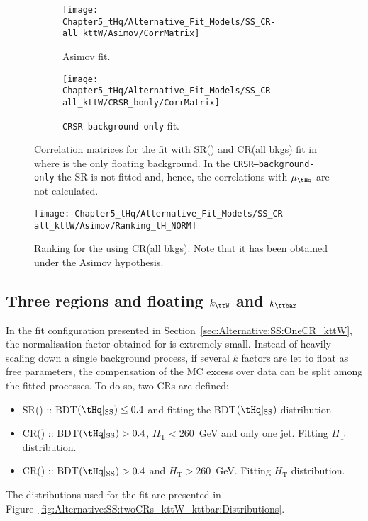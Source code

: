 \begin{figure}[h]
\centering
\begin{subfigure}{.5\textwidth}
  \centering
  \texttt{[image: Chapter5\_tHq/Alternative\_Fit\_Models/SS\_CR-all\_kttW/Asimov/CorrMatrix]}
  \caption{Asimov fit.}
\end{subfigure}%
\begin{subfigure}{.5\textwidth}
  \centering
  \texttt{[image: Chapter5\_tHq/Alternative\_Fit\_Models/SS\_CR-all\_kttW/CRSR\_bonly/CorrMatrix]}
  \caption{\texttt{CRSR--background-only} fit.}
\end{subfigure}
\caption{Correlation matrices for the fit with SR(\tHq) and CR(all bkgs) fit in \dilepSStau where \ttW is the only floating background.
	In the \texttt{CRSR--background-only} the SR is not fitted and, hence, the correlations with $\mu_{\tHq}$ are not calculated. }
\label{fig:Alternative:SS:OneCR_kttW:matrices}
\end{figure}


\begin{figure}[h]
\centering
  \centering
  \texttt{[image: Chapter5\_tHq/Alternative\_Fit\_Models/SS\_CR-all\_kttW/Asimov/Ranking\_tH\_NORM]}
\caption{Ranking for the \dilepSStau using CR(all bkgs). Note that it has been obtained under the Asimov hypothesis.}
\label{fig:Alternative:SS:OneCR_kttW:ranking}
\end{figure}


\subsection{Three regions and floating $k_{\ttW}$ and $k_{\ttbar}$}
\label{sec:Alternative:SS:twoCRs_kttW_kttbar}
In the fit configuration presented in Section~\ref{sec:Alternative:SS:OneCR_kttW}, the normalisation
factor obtained for \ttW is extremely small. Instead of heavily scaling down a single background process,
if several $k$ factors are let to float as free parameters, the compensation of the MC excess over data
can be split among the fitted processes. To do so, two CRs are defined:
\begin{itemize}
	\item SR(\tHq) :: BDT$(\tHq|_{\text{SS}}) \leq 0.4$ and fitting the BDT$(\tHq|_{\text{SS}})$ distribution.
	\item CR(\ttbar) :: BDT$(\tHq|_{\text{SS}}) > 0.4$, $H_{\text{T}} <260$~GeV and only one \btagged jet. Fitting $H_{\text{T}}$ distribution. 
	\item CR(\ttX) :: BDT$(\tHq|_{\text{SS}}) > 0.4$ and $H_{\text{T}} >260$~GeV.  Fitting $H_{\text{T}}$ distribution.
\end{itemize}
The distributions used for the fit are presented in Figure~\ref{fig:Alternative:SS:twoCRs_kttW_kttbar:Distributions}.

